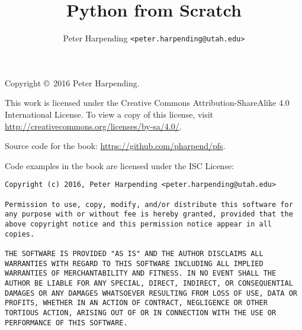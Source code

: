 \documentclass[12pt,letterpaper,oneside]{memoir}
\theoremstyle{definition}
\theoremstyle{plain}
\begin{document}
\title{Python from Scratch}
\author{Peter Harpending \texttt{<peter.harpending@utah.edu>}}
\maketitle

\noindent \hrulefill

Copyright \copyright\ 2016 Peter Harpending.

This work is licensed under the Creative Commons
Attribution-ShareAlike 4.0 International License. To view a copy of
this license, visit
\url{http://creativecommons.org/licenses/by-sa/4.0/}.

Source code for the book: \url{https://github.com/pharpend/pfs}.

Code examples in the book are licensed under the ISC License:

\begin{lstlisting}
Copyright (c) 2016, Peter Harpending <peter.harpending@utah.edu>

Permission to use, copy, modify, and/or distribute this software for
any purpose with or without fee is hereby granted, provided that the
above copyright notice and this permission notice appear in all
copies.

THE SOFTWARE IS PROVIDED "AS IS" AND THE AUTHOR DISCLAIMS ALL
WARRANTIES WITH REGARD TO THIS SOFTWARE INCLUDING ALL IMPLIED
WARRANTIES OF MERCHANTABILITY AND FITNESS. IN NO EVENT SHALL THE
AUTHOR BE LIABLE FOR ANY SPECIAL, DIRECT, INDIRECT, OR CONSEQUENTIAL
DAMAGES OR ANY DAMAGES WHATSOEVER RESULTING FROM LOSS OF USE, DATA OR
PROFITS, WHETHER IN AN ACTION OF CONTRACT, NEGLIGENCE OR OTHER
TORTIOUS ACTION, ARISING OUT OF OR IN CONNECTION WITH THE USE OR
PERFORMANCE OF THIS SOFTWARE.
\end{lstlisting}

\noindent \hrulefill

\tableofcontents




\printbibliography
\end{document}
